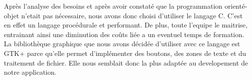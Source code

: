 \documentclass[a4]{article}
\begin{document}
			
			 Après l'analyse des besoins et après avoir constaté que la programmation orienté-objet n'etait pas nécessaire, nous avons donc choisi d'utiliser le langage C.
			C'est en effet un langage procédurale et performant.
			De plus, toute l'equipe le maitrise, entrainant ainsi une diminution des coûts liée a un eventuel temps de formation.
			La bibliothèque graphique que nous avons décidée d'utiliser avec ce langage est GTK+ parce qu'elle permet d'implémenter des boutons, des zones de texte et du traitement de fichier.
			Elle nous semblait donc la plus adaptée au developement de notre application.
			 
			
\end{document}
